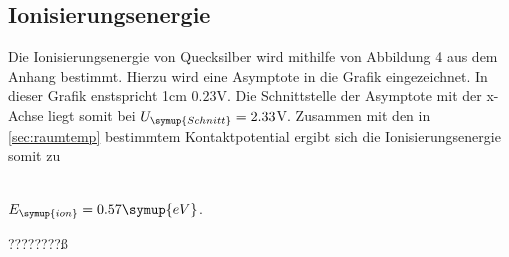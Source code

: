     \subsection{Ionisierungsenergie} 
    Die Ionisierungsenergie von Quecksilber wird mithilfe von Abbildung 4 aus dem Anhang bestimmt. 
    Hierzu wird eine Asymptote in die Grafik eingezeichnet. In dieser Grafik enstspricht 1cm $0.23$V.
    Die Schnittstelle der Asymptote mit der x-Achse liegt somit bei $U_{\symup{Schnitt}} = 2.33$V.
    Zusammen mit den in \autoref{sec:raumtemp} bestimmtem Kontaktpotential
    ergibt sich die Ionisierungsenergie somit zu
    \\ \\
    \centerline{$E_{\symup{ion}} = 0.57 \symup{eV}$.}????????ß
    \\ \\

